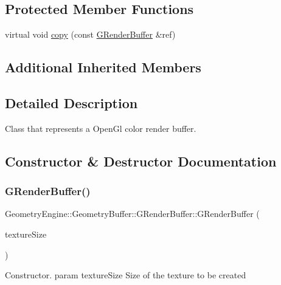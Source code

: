 \subsection*{Protected Member Functions}
\begin{DoxyCompactItemize}
\item 
virtual void \mbox{\hyperlink{class_geometry_engine_1_1_geometry_buffer_1_1_g_render_buffer_ad747a5783a7c5cbae9f4ad9aea753896}{copy}} (const \mbox{\hyperlink{class_geometry_engine_1_1_geometry_buffer_1_1_g_render_buffer}{G\+Render\+Buffer}} \&ref)
\end{DoxyCompactItemize}
\subsection*{Additional Inherited Members}


\subsection{Detailed Description}
Class that represents a Open\+Gl color render buffer. 

\subsection{Constructor \& Destructor Documentation}
\mbox{\label{class_geometry_engine_1_1_geometry_buffer_1_1_g_render_buffer_a2773a6ecf7fa8ee49b45b3f0a99b5b4b}} 
\subsubsection{\texorpdfstring{GRenderBuffer()}{GRenderBuffer()}\hspace{0.1cm}{\footnotesize\ttfamily [1/3]}}
{\footnotesize\ttfamily Geometry\+Engine\+::\+Geometry\+Buffer\+::\+G\+Render\+Buffer\+::\+G\+Render\+Buffer (\begin{DoxyParamCaption}\item[{const Q\+Vector2D \&}]{texture\+Size }\end{DoxyParamCaption})}

Constructor. param texture\+Size Size of the texture to be created \mbox{\label{class_geometry_engine_1_1_geometry_buffer_1_1_g_render_buffer_a9e59998fe3f0dadc0458c1c9755b635a}} 
